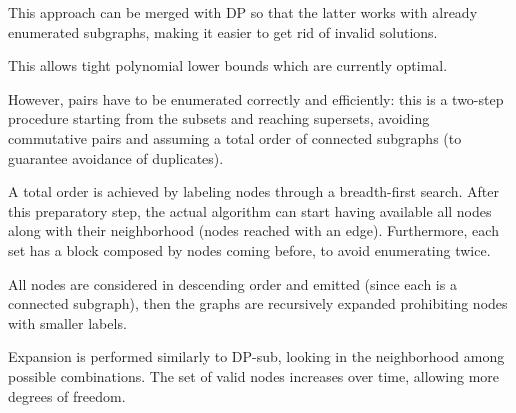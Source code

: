 This approach can be merged with DP so that the latter works with already enumerated subgraphs, making it easier to get rid of invalid solutions.

This allows tight polynomial lower bounds which are currently optimal. 

However, pairs have to be enumerated correctly and efficiently: this is a two-step procedure starting from the subsets and reaching supersets, avoiding commutative pairs and assuming a total order of connected subgraphs (to guarantee avoidance of duplicates).

A total order is achieved by labeling nodes through a breadth-first search. After this preparatory step, the actual algorithm can start having available all nodes along with their neighborhood (nodes reached with an edge). Furthermore, each set has a block composed by nodes coming before, to avoid enumerating twice.

All nodes are considered in descending order and emitted (since each is a connected subgraph), then the graphs are recursively expanded prohibiting nodes with smaller labels. 

Expansion is performed similarly to DP-sub, looking in the neighborhood among possible combinations. The set of valid nodes increases over time, allowing more degrees of freedom.





 